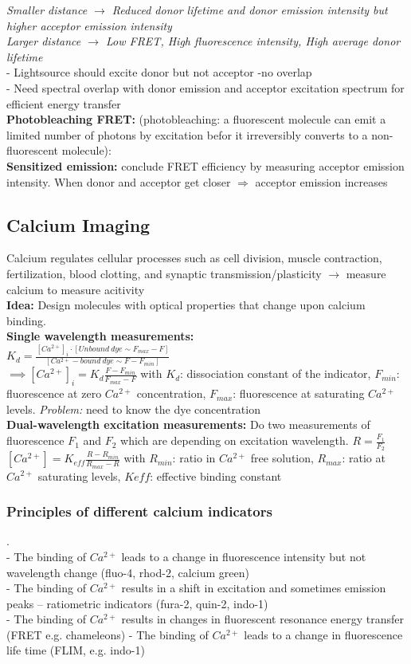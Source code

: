 \documentclass[9pt]{article}
\begin{document}
\begin{multicols}{2}
\emph{Smaller distance $\rightarrow$ Reduced donor lifetime and donor emission intensity but higher acceptor emission intensity}\\
\emph{Larger distance $\rightarrow$ Low FRET, High fluorescence intensity, High average donor lifetime}\\
- Lightsource should excite donor but not acceptor -no overlap\\
- Need spectral overlap with donor emission and acceptor excitation spectrum for efficient energy transfer\\
\textbf{Photobleaching FRET:} (photobleaching: a fluorescent molecule can emit a limited number of photons by excitation befor it irreversibly converts to a non-fluorescent molecule):\\
\textbf{Sensitized emission:}
conclude FRET efficiency by measuring acceptor emission intensity. When donor and acceptor get
closer $\Rightarrow$ acceptor emission increases


\subsection{Calcium Imaging}
Calcium regulates cellular processes such as cell
division, muscle contraction, fertilization, blood
clotting, and synaptic transmission/plasticity $\rightarrow$ measure calcium to measure acitivity\\
\textbf{Idea:} Design molecules with optical properties that change upon calcium binding.\\
\textbf{Single wavelength measurements: }\\
$K_d=\frac{[Ca^{2+}]_i\cdot [Unbound\ dye \sim F_{max}-F]}{[Ca^{2+}-bound\ dye \sim F-F_{min}]}$\\
$\implies [Ca^{2+}]_i =K_d\frac{F-F_{min}}{F_{max}-F}$ with $K_d$: dissociation constant of the indicator, $F_{min}$: fluorescence at zero $Ca^{2+}$ concentration, $F_{max}$: fluorescence at saturating $Ca^{2+}$ levels. \emph{Problem:} need to know the dye concentration\\
\textbf{Dual-wavelength excitation measurements: } Do two measurements of fluorescence $F_1$ and $F_2$ which are depending on excitation wavelength. $R=\frac{F_1}{F_2}$\\
$[Ca^{2+}]=K_{eff} \frac{R-R_{min}}{R_{max}-R}$ with $R_{min}$: ratio in $Ca^{2+}$ free solution, $R_{max}$: ratio at $Ca^{2+}$ saturating levels, $K{eff}$: effective binding constant
\subsubsection{Principles of different calcium indicators}.\\
- The binding of  $Ca^{2+}$ leads to a change in fluorescence intensity but not
wavelength change (fluo-4, rhod-2, calcium green)\\
- The binding of $Ca^{2+}$ results in a shift in excitation and sometimes emission
peaks – ratiometric indicators (fura-2, quin-2, indo-1)\\
- The binding of $Ca^{2+}$ results in changes in fluorescent resonance energy
transfer (FRET e.g. chameleons)
- The binding of $Ca^{2+}$ leads to a change in fluorescence life time (FLIM, e.g.
indo-1)

\end{multicols}
\end{document}
